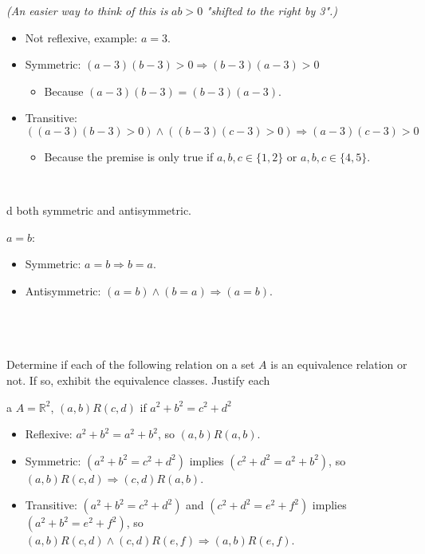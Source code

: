 \documentclass{article}
\begin{document}
\textit{(An easier way to think of this is }$ab >0$\textit{ "shifted to the right by 3".)}
\begin{itemize}
\item Not reflexive, example: $a=3$.
\item Symmetric: $( a-3)( b-3)  >0\Rightarrow ( b-3)( a-3)  >0$ 
\begin{itemize}
\item Because $( a-3)( b-3) =( b-3)( a-3)$.
\end{itemize}
\item Transitive: $(( a-3)( b-3)  >0) \land (( b-3)( c-3)  >0) \Rightarrow ( a-3)( c-3)  >0$
\begin{itemize}
\item Because the premise is only true if $a,b,c\in \{1,2\}$ or $a,b,c\in \{4,5\}$.
\end{itemize}
\end{itemize}

\

\begin{problem} d
both symmetric and antisymmetric.
\end{problem}

$ a=b$:
\begin{itemize}
\item Symmetric: $ a=b\Rightarrow b=a$.
\item Antisymmetric: $ ( a=b) \land ( b=a) \Rightarrow ( a=b)$.
\end{itemize}

\
\hline
\section{}

\begin{problem*}
Determine if each of the following relation on a set $A$ is an equivalence relation or not. If so, exhibit the equivalence classes. Justify each
\end{problem*}

\begin{problem} a
$A=\mathbb{R}^2$, $(a,b) R(c,d)$ if $a^2+b^2=c^2+d^2$
\end{problem}


\begin{itemize}
\item Reflexive: $a^{2} +b^{2} =a^{2} +b^{2}$, so $(a,b)R(a,b)$.
\item Symmetric: $\left( a^{2} +b^{2} =c^{2} +d^{2}\right)$ implies $\left( c^{2} +d^{2} =a^{2} +b^{2}\right)$, so $(a,b)R(c,d)\Rightarrow (c,d)R(a,b)$.
\item Transitive: $\left( a^{2} +b^{2} =c^{2} +d^{2}\right)$ and $\left( c^{2} +d^{2} =e^{2} +f^{2}\right)$ implies $\left( a^{2} +b^{2} =e^{2} +f^{2}\right)$, so $(a,b)R(c,d)\land(c,d)R(e,f)\Rightarrow (a,b)R(e,f)$.
\end{itemize}
\end{document}

